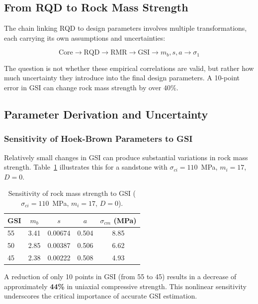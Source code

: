 \documentclass[a4paper,12pt]{article}
\begin{document}
\subsection{From RQD to Rock Mass Strength}
The chain linking RQD to design parameters involves multiple transformations, each carrying its own assumptions and uncertainties:

\[
\text{Core} \rightarrow \text{RQD} \rightarrow \text{RMR} \rightarrow \text{GSI} \rightarrow m_b, s, a \rightarrow \sigma_1
\]

\begin{warnbox}
The question is not whether these empirical correlations are valid, but rather how much uncertainty they introduce into the final design parameters. A 10-point error in GSI can change rock mass strength by over 40\%.
\end{warnbox}

\subsection{Parameter Derivation and Uncertainty}

\subsubsection{Sensitivity of Hoek-Brown Parameters to GSI}
Relatively small changes in GSI can produce substantial variations in rock mass strength. Table~\ref{tab:sensitivity} illustrates this for a sandstone with $\sigma_{ci}=110$~MPa, $m_i=17$, $D=0$.

\begin{table}[h!]
\centering
\small
\begin{tabular}{lcccc}
\toprule
\textbf{GSI} & \textbf{\(m_b\)} & \textbf{\(s\)} & \textbf{\(a\)} & \textbf{\(\sigma_{cm}\) (MPa)} \\
\midrule
55 & 3.41 & 0.00674 & 0.504 & 8.85 \\
50 & 2.85 & 0.00387 & 0.506 & 6.62 \\
45 & 2.38 & 0.00222 & 0.508 & 4.93 \\
\bottomrule
\end{tabular}
\caption{Sensitivity of rock mass strength to GSI ($\sigma_{ci}=110$~MPa, $m_i=17$, $D=0$).}
\label{tab:sensitivity}
\end{table}

A reduction of only 10 points in GSI (from 55 to 45) results in a decrease of approximately \textbf{44\%} in uniaxial compressive strength. This nonlinear sensitivity underscores the critical importance of accurate GSI estimation.
\end{document}
